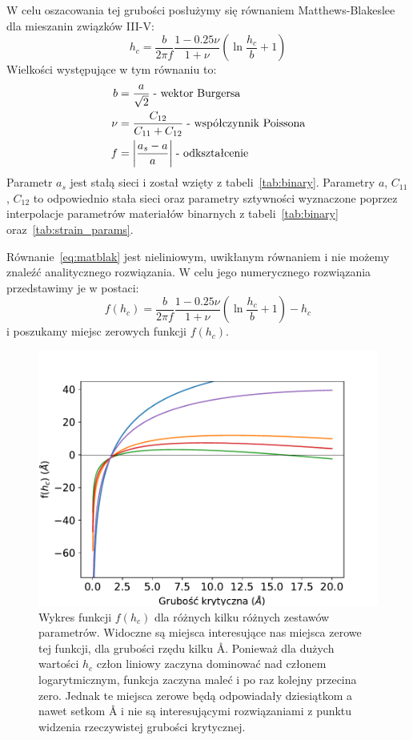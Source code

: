 \documentclass[12pt,openany,a4paper]{book}
\begin{document}
W celu oszacowania tej grubości posłużymy się równaniem Matthews-Blakeslee dla mieszanin
związków III-V:
\begin{equation}
	h_c = \frac{b}{2\pi f} \frac{1-0.25\nu}{1+\nu}\left( \ln{\frac{h_c}{b} +1}\right)
\label{eq:matblak}
\end{equation}
Wielkości występujące w tym równaniu to:
\begin{align*}
	b &= \frac{a}{\sqrt{2}} \;\text{- wektor Burgersa}\\
	\nu &= \frac{C_{12}}{C_{11}+C_{12}} \;\text{- współczynnik Poissona}\\
	f &= \abs{\frac{a_s-a}{a}} \; \text{- odkształcenie}
\end{align*}
Parametr \(a_s\) jest stałą sieci  i został wzięty z tabeli~\ref{tab:binary}.
Parametry \(a\), \(C_{11}\), \(C_{12}\) to odpowiednio stała sieci oraz parametry sztywności
 wyznaczone poprzez interpolacje parametrów materiałów
binarnych z tabeli~\ref{tab:binary} oraz~\ref{tab:strain_params}.

Równanie~\ref{eq:matblak} jest nieliniowym, uwikłanym równaniem i nie możemy znaleźć analitycznego
rozwiązania. W celu jego numerycznego rozwiązania przedstawimy je w postaci:
\begin{equation}
	f(h_c) = \frac{b}{2\pi f} \frac{1-0.25\nu}{1+\nu}\left( \ln{\frac{h_c}{b} +1}\right) - h_c
	\label{eq:fhc}
\end{equation}
i poszukamy miejsc zerowych funkcji \(f(h_c)\).

\begin{figure}[htbp]
	\centering
	\includegraphics[width = 0.8\linewidth]{Figures/thickness/fhc.pdf}
	\caption{Wykres funkcji \(f(h_c)\) dla różnych kilku różnych zestawów parametrów. Widoczne są miejsca
	interesujące nas miejsca zerowe tej funkcji, dla grubości rzędu kilku \AA. Ponieważ dla dużych wartości
	\(h_c\) człon liniowy zaczyna dominować nad członem logarytmicznym, funkcja zaczyna maleć i po raz kolejny przecina zero.
	Jednak te miejsca zerowe będą odpowiadały dziesiątkom a nawet setkom \AA{} i nie są interesującymi rozwiązaniami z punktu
	widzenia rzeczywistej grubości krytycznej.}
	\label{fig:fhc}
\end{figure}
\end{document}
